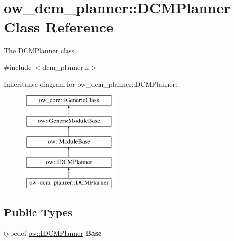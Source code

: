 \hypertarget{classow__dcm__planner_1_1DCMPlanner}{}\section{ow\+\_\+dcm\+\_\+planner\+:\+:D\+C\+M\+Planner Class Reference}
\label{classow__dcm__planner_1_1DCMPlanner}


The \hyperlink{classow__dcm__planner_1_1DCMPlanner}{D\+C\+M\+Planner} class.  




{\ttfamily \#include $<$dcm\+\_\+planner.\+h$>$}

Inheritance diagram for ow\+\_\+dcm\+\_\+planner\+:\+:D\+C\+M\+Planner\+:\begin{figure}[H]
\begin{center}
\leavevmode
\includegraphics[height=5.000000cm]{d6/d66/classow__dcm__planner_1_1DCMPlanner}
\end{center}
\end{figure}
\subsection*{Public Types}
\begin{DoxyCompactItemize}
\item 
typedef \hyperlink{classow_1_1IDCMPlanner}{ow\+::\+I\+D\+C\+M\+Planner} {\bfseries Base}\hypertarget{classow__dcm__planner_1_1DCMPlanner_a435f68496dbc9f8321b236f508d83e95}{}\label{classow__dcm__planner_1_1DCMPlanner_a435f68496dbc9f8321b236f508d83e95}

\end{DoxyCompactItemize}

